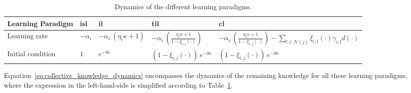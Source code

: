 \documentclass[12pt]{article}
\begin{document}
\begin{table}[!t]
    \caption{Dynamics of the different learning paradigms.\label{tab:learning_paradigms_expressions}}
    \begin{center}
        \begin{adjustbox}{width=\textwidth}
            \begin{tabular}{
                >{\raggedright\arraybackslash}p{3cm} 
                *{3}{>{\centering\arraybackslash}p{3cm}}
                *{1}{>{\centering\arraybackslash}p{6.5cm}}
            }            
                \toprule
                \textbf{Learning Paradigm} 
                & \textbf{\ac{isl}} 
                & \textbf{\ac{il}} 
                & \textbf{\ac{til}} 
                & \textbf{\ac{cl}} \\
                \midrule
                Learning rate 
                & $-\alpha_i$ 
                & $-\alpha_i\:\left(\eta_i \kappa + 1 \right)$ 
                & $-\alpha_i\:\left( \frac{\eta_i \kappa + 1}{1 - \xi_{i,j}(\cdot)} \right)$ 
                & $-\alpha_i\:\left( \frac{\eta_i \kappa + 1}{1 - \xi_{i,j}(\cdot)} \right) - \sum_{l \in \mathcal{N}(j)}\bar{\xi}_{i,l}(\cdot)\gamma_{i,l}d(\cdot)$ \\
                \addlinespace[0.5ex]
                Initial condition 
                & $1$ 
                & $e^{-\delta \kappa}$ 
                & $\left(1-\xi_{i,j}(\cdot)\right)\: e^{-\delta \kappa}$ 
                & $\left(1-\xi_{i,j}(\cdot)\right)\: e^{-\delta \kappa}$ \\
                \bottomrule
            \end{tabular}
        \end{adjustbox}
    \end{center}
\end{table}

Equation~\eqref{eq:collective_knowledge_dynamics} encompasses the dynamics of the remaining knowledge for all these learning paradigms, where the expression in the left-hand-side is simplified according to  Table~\ref{tab:learning_paradigms_expressions}. 
\end{document}
